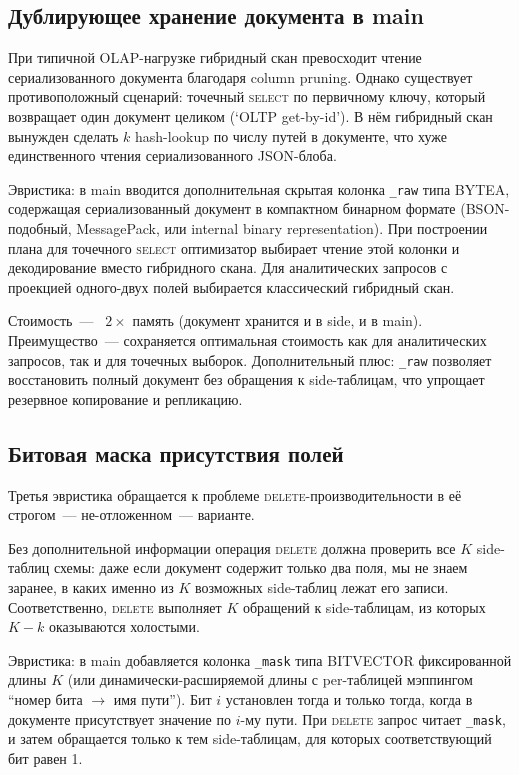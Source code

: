 \documentclass[conference,a4paper,10pt]{IEEEtran}
\begin{document}
\subsection{Дублирующее хранение документа в main}

При типичной OLAP-нагрузке гибридный скан превосходит чтение
сериализованного документа благодаря column pruning. Однако
существует противоположный сценарий: точечный \textsc{select} по
первичному ключу, который возвращает один документ целиком (`OLTP
get-by-id'). В нём гибридный скан вынужден сделать $k$ hash-lookup
по числу путей в документе, что хуже единственного чтения
сериализованного JSON-блоба.

Эвристика: в main вводится дополнительная скрытая колонка
\texttt{\_raw} типа BYTEA, содержащая сериализованный документ в
компактном бинарном формате (BSON-подобный, MessagePack, или
internal binary representation). При построении плана для точечного
\textsc{select} оптимизатор выбирает чтение этой колонки и
декодирование вместо гибридного скана. Для аналитических запросов с
проекцией одного-двух полей выбирается классический гибридный скан.

Стоимость~--- ~$2\times$ память (документ хранится и в side, и в
main). Преимущество~--- сохраняется оптимальная стоимость как для
аналитических запросов, так и для точечных выборок. Дополнительный
плюс: \texttt{\_raw} позволяет восстановить полный документ без
обращения к side-таблицам, что упрощает резервное копирование и
репликацию.


\subsection{Битовая маска присутствия полей}

Третья эвристика обращается к проблеме \textsc{delete}-производи\-тель\-ности
в её строгом~--- не-отложенном~--- варианте.

Без дополнительной информации операция \textsc{delete} должна
проверить все $K$ side-таблиц схемы: даже если документ
содержит только два поля, мы не знаем заранее, в каких именно из
$K$ возможных side-таблиц лежат его записи. Соответственно,
\textsc{delete} выполняет $K$ обращений к side-таблицам, из
которых $K-k$ оказываются холостыми.

Эвристика: в main добавляется колонка \texttt{\_mask} типа
BITVECTOR фиксированной длины $K$ (или динамически-расширяемой
длины с per-таблицей мэппингом ``номер бита $\to$ имя пути''). Бит
$i$ установлен тогда и только тогда, когда в документе присутствует
значение по $i$-му пути. При \textsc{delete} запрос читает
\texttt{\_mask}, и затем обращается только к тем side-таблицам, для
которых соответствующий бит равен 1.
\end{document}
